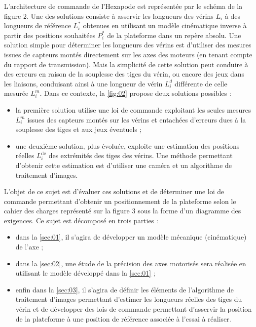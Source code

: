 L’architecture de commande de l’Hexapode est représentée par le schéma de la figure 2. Une des solutions
consiste à asservir les longueurs des vérins $L_i$ à des longueurs de référence $L_i^*$ 
obtenues en utilisant un modèle cinématique inverse à partir des positions souhaitées $P_i^*$ 
de la plateforme dans un repère absolu. Une solution
simple pour déterminer les longueurs des vérins est d’utiliser des mesures issues de capteurs montés directement
sur les axes des moteurs (en tenant compte du rapport de transmission). Mais la simplicité de cette solution
peut conduire à des erreurs en raison de la souplesse des tiges du vérin, ou encore des jeux dans les liaisons,
conduisant ainsi à une longueur de vérin $L_i^d$ 
différente de celle mesurée $L_i^m$. Dans ce contexte, la \autoref{fig:02} propose
deux solutions possibles :
\begin{itemize}
\item la première solution utilise une loi de commande exploitant les seules mesures $L_i^m$ issues des capteurs montés
sur les vérins et entachées d’erreurs dues à la souplesse des tiges et aux jeux éventuels ;
\item une deuxième solution, plus évoluée, exploite une estimation des positions réelles $L_i^{\text{de}}$ des extrémités des tiges
des vérins. Une méthode permettant d’obtenir cette estimation est d’utiliser une caméra et un algorithme
de traitement d’images.
\end{itemize}
L’objet de ce sujet est d’évaluer ces solutions et de déterminer une loi de commande permettant d’obtenir
un positionnement de la plateforme selon le cahier des charges représenté sur la figure 3 sous la forme d’un
diagramme des exigences. Ce sujet est décomposé en trois parties :
\begin{itemize}
\item dans la \autoref{sec:01}, il s’agira de développer un modèle mécanique (cinématique) de l’axe ;
\item dans la \autoref{sec:02}, une étude de la précision des axes motorisés sera réalisée en utilisant le modèle développé
dans la \autoref{sec:01} ;
\item enfin dans la \autoref{sec:03}, il s’agira de définir les éléments de l’algorithme de traitement d’images permettant
d’estimer les longueurs réelles des tiges du vérin et de développer des lois de commande permettant d’asservir
la position de la plateforme à une position de référence associée à l’essai à réaliser.
\end{itemize}


